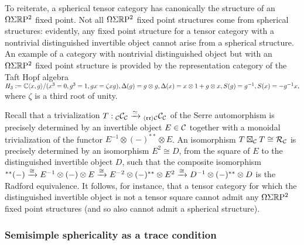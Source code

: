 \documentclass{amsart}
\begin{document}
To reiterate, a spherical tensor category has canonically the structure of an $\Omega \Sigma \mathbb R \mathrm{P}^2$ fixed point.  Not all $\Omega \Sigma \mathbb R \mathrm{P}^2$ fixed point structures come from spherical structures: evidently, any fixed point structure for a tensor category with a nontrivial distinguished invertible object cannot arise from a spherical structure.  An example of a category with nontrivial distinguished object but with an $\Omega \Sigma \mathbb R \mathrm{P}^2$ fixed point structure is provided by the representation category of the Taft Hopf algebra $H_3 := \mathbb C\langle x,g \rangle / (x^3=0,g^3=1,gx=\zeta xg), \Delta(g) = g \otimes g, \Delta(x) = x \otimes 1 + g \otimes x, S(g)=g^{-1}, S(x)=-g^{-1}x,$ where $\zeta$ is a third root of unity. 

Recall that a trivialization $T: {}_\mathcal C \mathcal C_\mathcal C \xrightarrow{\simeq} {}_{\langle \mathfrak{r r} \rangle \mathcal C} \mathcal C_\mathcal C$ of the Serre automorphism is precisely determined by an invertible object $E \in \mathcal C$ together with a monoidal trivialization of the functor $E^{-1} \otimes (-)^{**} \otimes E$.  An isomorphism $T \boxtimes_\mathcal C T \cong \mathcal R_\mathcal C$ is precisely determined by an isomorphism $E^2 \cong D$, from the square of $E$ to the distinguished invertible object $D$, such that the composite isomorphism ${}^{**} (-) \xrightarrow{\cong} E^{-1} \otimes (-) \otimes E \xrightarrow{\cong} E^{-2} \otimes (-)^{**} \otimes E^2 \xrightarrow{\cong} D^{-1} \otimes (-)^{**} \otimes D$ is the Radford equivalence.  It follows, for instance, that a tensor category for which the distinguished invertible object is not a tensor square cannot admit any $\Omega \Sigma \mathbb R \mathrm{P}^2$ fixed point structures (and so also cannot admit a spherical structure). %


\subsubsection{Semisimple sphericality as a trace condition}
\end{document}
